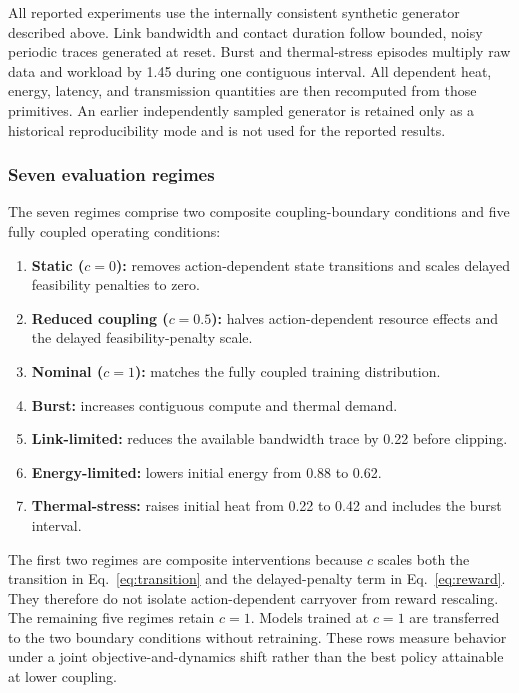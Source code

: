 \documentclass[remotesensing,article,submit,moreauthors]{Definitions/mdpi}
\begin{document}
All reported experiments use the internally consistent synthetic generator described above. Link bandwidth and contact duration follow bounded, noisy periodic traces generated at reset. Burst and thermal-stress episodes multiply raw data and workload by 1.45 during one contiguous interval. All dependent heat, energy, latency, and transmission quantities are then recomputed from those primitives. An earlier independently sampled generator is retained only as a historical reproducibility mode and is not used for the reported results.

\subsubsection{Seven evaluation regimes}

The seven regimes comprise two composite coupling-boundary conditions and five fully coupled operating conditions:

\begin{enumerate}[leftmargin=1.6em]
    \item \textbf{Static ($c=0$):} removes action-dependent state transitions and scales delayed feasibility penalties to zero.
    \item \textbf{Reduced coupling ($c=0.5$):} halves action-dependent resource effects and the delayed feasibility-penalty scale.
    \item \textbf{Nominal ($c=1$):} matches the fully coupled training distribution.
    \item \textbf{Burst:} increases contiguous compute and thermal demand.
    \item \textbf{Link-limited:} reduces the available bandwidth trace by 0.22 before clipping.
    \item \textbf{Energy-limited:} lowers initial energy from 0.88 to 0.62.
    \item \textbf{Thermal-stress:} raises initial heat from 0.22 to 0.42 and includes the burst interval.
\end{enumerate}

The first two regimes are composite interventions because $c$ scales both the transition in Eq.~\eqref{eq:transition} and the delayed-penalty term in Eq.~\eqref{eq:reward}. They therefore do not isolate action-dependent carryover from reward rescaling. The remaining five regimes retain $c=1$. Models trained at $c=1$ are transferred to the two boundary conditions without retraining. These rows measure behavior under a joint objective-and-dynamics shift rather than the best policy attainable at lower coupling.
\end{document}
